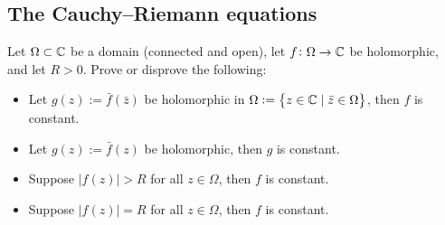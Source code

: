 \documentclass[11pt,a4paper]{article}
\begin{document}
\subsection{The Cauchy--Riemann equations}
\begin{exercise}
  Let $\Omega \subset \mathbb{C}$ be a domain (connected and open), let
  $f \colon \Omega \to \mathbb{C}$ be holomorphic, and let $R > 0$.
  Prove or disprove the following:
  \begin{itemize}
  \item[(1)] Let $g(z) := \bar f(\bar z)$ be holomorphic in 
    $\Omega := \left\{z \in \mathbb{C} \mid \bar z \in \Omega\right\}$, then $f$ is constant.
  \item[(2)] Let $g(z) := \bar f(z)$ be holomorphic, then $g$ is constant.
  \item[(3)] Suppose $|f(z)| > R$ for all $z \in \Omega$, then $f$ is
    constant.
  \item[(4)] Suppose $|f(z)| = R$ for all $z \in \Omega$, then $f$ is
    constant.
  \end{itemize}
\end{exercise}
\end{document}
